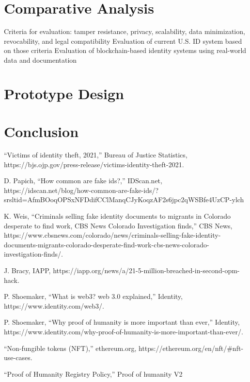 \documentclass[conference]{IEEEtran}
\begin{document}
\section{Comparative Analysis}
Criteria for evaluation: tamper resistance, privacy, scalability, data minimization, revocability, and legal compatibility
Evaluation of current U.S. ID system based on those criteria
Evaluation of blockchain-based identity systems using real-world data and documentation

\section{Prototype Design}

\section{Conclusion}


\begin{thebibliography}{00}
“Victims of identity theft, 2021,” Bureau of Justice Statistics, https://bjs.ojp.gov/press-release/victims-identity-theft-2021. 

D. Papich, “How common are fake ids?,” IDScan.net,
https://idscan.net/blog/how-common-are-fake-ids/?srsltid=AfmBOoqOPSxNFDdifCClManqCJyKoqzAF2s6jpc2qWSBfe4UzCP-ylch

K. Weis, “Criminals selling fake identity documents to migrants in Colorado desperate to find work, CBS News Colorado Investigation finds,” CBS News, https://www.cbsnews.com/colorado/news/criminals-selling-fake-identity-documents-migrants-colorado-desperate-find-work-cbs-news-colorado-investigation-finds/. 

J. Bracy, IAPP, https://iapp.org/news/a/21-5-million-breached-in-second-opm-hack. 

P. Shoemaker, “What is web3? web 3.0 explained,” Identity, https://www.identity.com/web3/.

P. Shoemaker, “Why proof of humanity is more important than ever,” Identity, https://www.identity.com/why-proof-of-humanity-is-more-important-than-ever/.

“Non-fungible tokens (NFT),” ethereum.org, https://ethereum.org/en/nft/#nft-use-cases.

“Proof of Humanity Registry Policy,” Proof of humanity V2

\end{thebibliography}
\end{document}
